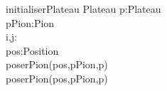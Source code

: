 \begin{algorithme}
  \small
  \fonction
  {initialiserPlateau}
  {}
  {Plateau}
  {p:Plateau\\
  pPion:Pion\\
  i,j:\naturel\\
  pos:Position}
  { 
    {
      {
        {
          \\
          poserPion(pos,pPion,p)
        }
        {
          \\
          poserPion(pos,pPion,p)
        }
      }
    }
  }
\end{algorithme}

